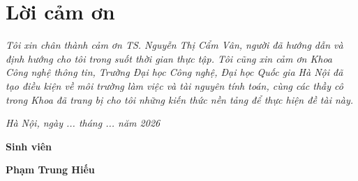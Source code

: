\clearpage
{}
{}
\chapter*{Lời cảm ơn}

\textit{Tôi xin chân thành cảm ơn TS. Nguyễn Thị Cẩm Vân, người đã hướng dẫn và định hướng cho tôi trong suốt thời gian thực tập. Tôi cũng xin cảm ơn Khoa Công nghệ thông tin, Trường Đại học Công nghệ, Đại học Quốc gia Hà Nội đã tạo điều kiện về môi trường làm việc và tài nguyên tính toán, cùng các thầy cô trong Khoa đã trang bị cho tôi những kiến thức nền tảng để thực hiện đề tài này.}

\vspace{1cm}
\hspace{7cm}\textit{Hà Nội, ngày ... tháng ... năm 2026}

\hspace{9.4cm}\textbf{Sinh viên}
\vspace{2.5cm}

\hspace{8.8cm}\textbf{Phạm Trung Hiếu}
